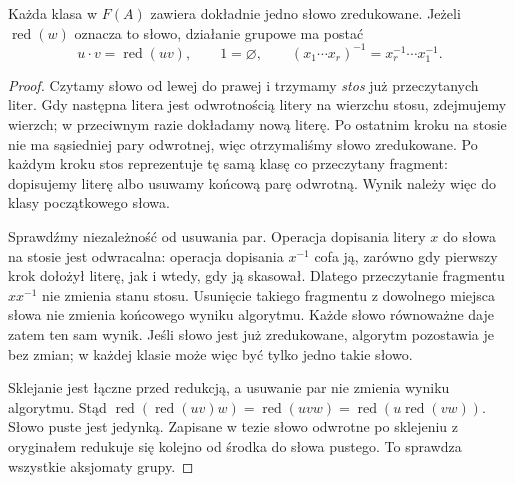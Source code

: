 \begin{stwierdzenie}
\label{prop:free-reduction-5}
Każda klasa w $F(A)$ zawiera dokładnie jedno
słowo zredukowane. Jeżeli $\operatorname{red}(w)$
oznacza to słowo, działanie grupowe ma postać
\[
 u\cdot v=\operatorname{red}(uv),\qquad
 1=\varnothing,\qquad
 (x_1\cdots x_r)^{-1}=x_r^{-1}\cdots x_1^{-1}.
\]
\end{stwierdzenie}
\begin{proof}
Czytamy słowo od lewej do prawej i trzymamy
\emph{stos} już przeczytanych liter.
Gdy następna litera jest odwrotnością
litery na wierzchu stosu, zdejmujemy wierzch;
w przeciwnym razie dokładamy nową literę.
Po ostatnim kroku na stosie nie ma sąsiedniej
pary odwrotnej, więc otrzymaliśmy słowo
zredukowane. Po każdym kroku stos reprezentuje tę samą
klasę co przeczytany fragment: dopisujemy literę albo
usuwamy końcową parę odwrotną. Wynik należy więc do klasy
początkowego słowa.

Sprawdźmy niezależność od usuwania par.
Operacja dopisania litery $x$ do słowa
na stosie jest odwracalna: operacja
dopisania $x^{-1}$ cofa ją, zarówno gdy
pierwszy krok dołożył literę, jak i wtedy,
gdy ją skasował. Dlatego przeczytanie
fragmentu $xx^{-1}$ nie zmienia stanu stosu.
Usunięcie takiego fragmentu z dowolnego miejsca
słowa nie zmienia końcowego wyniku algorytmu.
Każde słowo równoważne daje zatem ten sam wynik.
Jeśli słowo jest już zredukowane, algorytm
pozostawia je bez zmian; w każdej klasie
może więc być tylko jedno takie słowo.

Sklejanie jest łączne przed redukcją, a
usuwanie par nie zmienia wyniku algorytmu.
Stąd $\operatorname{red}(\operatorname{red}(uv)w)
=\operatorname{red}(uvw)
=\operatorname{red}(u\operatorname{red}(vw))$.
Słowo puste jest jedynką. Zapisane w tezie
słowo odwrotne po sklejeniu z oryginałem
redukuje się kolejno od środka do słowa pustego.
To sprawdza wszystkie aksjomaty grupy.
\end{proof}

